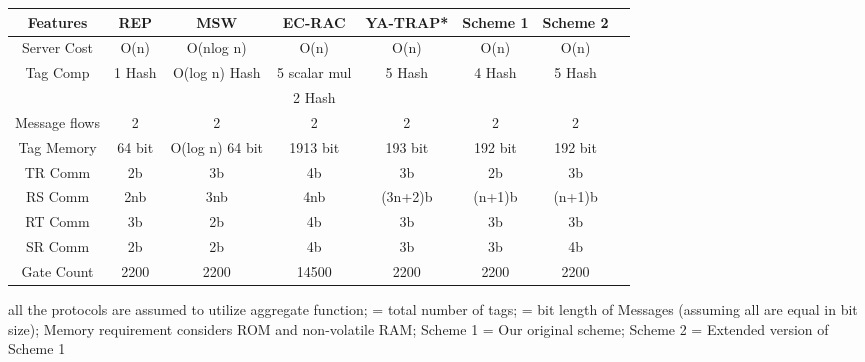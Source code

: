 \documentclass{easychair}
\begin{document}
\begin{table*}[hbp]
\begin{center}
{\begin {tabular}{|c|c|c|c|c|c|c|c|}
\hline
Features                      & REP            & MSW                       & EC-RAC\cite{ecrac4}       & YA-TRAP*     & Scheme 1  & Scheme 2  \\
\hline
Server Cost                   & O(n)           & O(nlog n)             & O(n)                      & O(n)         & O(n)       & O(n)\\
\hline
Tag Comp                      & 1 Hash         & O(log n) Hash             & 5 scalar mul              & 5 Hash       &  4 Hash    &  5 Hash\\         
                              & &                                          & 2 Hash  & & &\\
\hline
Message flows                 & 2              & 2                         & 2                         & 2            &  2          &  2  \\
\hline
Tag Memory                    & 64 bit        & O(log n) 64 bit    & 1913 bit                  & 193 bit      &  192 bit    &  192 bit  \\
\hline
TR Comm          & 2b             & 3b                        &  4b                       & 3b           &  2b         &  3b\\
\hline 
RS Comm          & 2nb            & 3nb                       &  4nb                      & (3n+2)b      &  (n+1)b     &  (n+1)b\\
\hline
RT Comm          & 3b             & 2b                        &  4b                        & 3b           &  3b        &  3b\\
\hline 
SR Comm          & 2b             & 2b                        &  4b                        & 3b           &  3b        &  4b\\
\hline
Gate Count                    &  2200    &  2200               &  14500               &  2200  &  2200 &  2200 \\
\hline
\end{tabular} \hfill}
\end{center}
\label{table cont.}

{\footnotesize {all the protocols are assumed to utilize aggregate function;  = total number of tags;  = bit length of Messages (assuming all are equal 
in bit size); Memory requirement considers ROM and non-volatile RAM; Scheme 1 = Our original scheme; Scheme 2 = Extended version of Scheme 1 }}

\end{table*}
\end{document}
